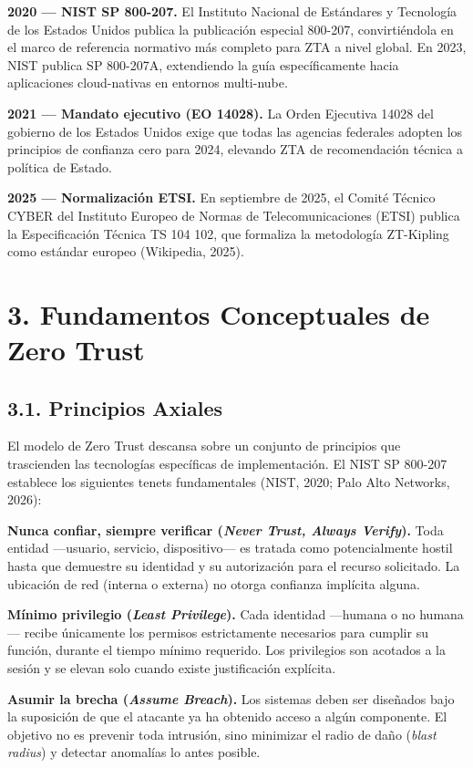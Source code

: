 \documentclass[12pt,a4paper]{article}
\begin{document}
\textbf{2020 — NIST SP 800-207.} El Instituto Nacional de Estándares y Tecnología de los Estados Unidos publica la publicación especial 800-207, convirtiéndola en el marco de referencia normativo más completo para ZTA a nivel global. En 2023, NIST publica SP 800-207A, extendiendo la guía específicamente hacia aplicaciones cloud-nativas en entornos multi-nube.

\textbf{2021 — Mandato ejecutivo (EO 14028).} La Orden Ejecutiva 14028 del gobierno de los Estados Unidos exige que todas las agencias federales adopten los principios de confianza cero para 2024, elevando ZTA de recomendación técnica a política de Estado.

\textbf{2025 — Normalización ETSI.} En septiembre de 2025, el Comité Técnico CYBER del Instituto Europeo de Normas de Telecomunicaciones (ETSI) publica la Especificación Técnica TS 104 102, que formaliza la metodología ZT-Kipling como estándar europeo (Wikipedia, 2025).



\section{3. Fundamentos Conceptuales de Zero Trust}

\subsection{3.1. Principios Axiales}

El modelo de Zero Trust descansa sobre un conjunto de principios que trascienden las tecnologías específicas de implementación. El NIST SP 800-207 establece los siguientes tenets fundamentales (NIST, 2020; Palo Alto Networks, 2026):

\textbf{Nunca confiar, siempre verificar (\textit{Never Trust, Always Verify}).} Toda entidad —usuario, servicio, dispositivo— es tratada como potencialmente hostil hasta que demuestre su identidad y su autorización para el recurso solicitado. La ubicación de red (interna o externa) no otorga confianza implícita alguna.

\textbf{Mínimo privilegio (\textit{Least Privilege}).} Cada identidad —humana o no humana— recibe únicamente los permisos estrictamente necesarios para cumplir su función, durante el tiempo mínimo requerido. Los privilegios son acotados a la sesión y se elevan solo cuando existe justificación explícita.

\textbf{Asumir la brecha (\textit{Assume Breach}).} Los sistemas deben ser diseñados bajo la suposición de que el atacante ya ha obtenido acceso a algún componente. El objetivo no es prevenir toda intrusión, sino minimizar el radio de daño (\textit{blast radius}) y detectar anomalías lo antes posible.
\end{document}
